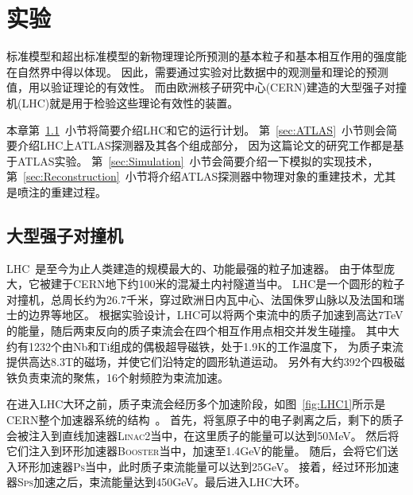 

\chapter{实验}
\label{cha:EXP}

标准模型和超出标准模型的新物理理论所预测的基本粒子和基本相互作用的强度能在自然界中得以体现。
因此，需要通过实验对比数据中的观测量和理论的预测值，用以验证理论的有效性。
而由欧洲核子研究中心(CERN)建造的大型强子对撞机(LHC)就是用于检验这些理论有效性的装置。

本章第~\ref{sec:LHC}~小节将简要介绍LHC和它的运行计划。
第~\ref{sec:ATLAS}~小节则会简要介绍LHC上ATLAS探测器及其各个组成部分，
因为这篇论文的研究工作都是基于ATLAS实验。
第~\ref{sec:Simulation}~小节会简要介绍一下模拟的实现技术，
第~\ref{sec:Reconstruction}~小节将介绍ATLAS探测器中物理对象的重建技术，尤其是喷注的重建过程。

\section{大型强子对撞机}
\label{sec:LHC}

LHC~\cite{Evans:2008zzb}是至今为止人类建造的规模最大的、功能最强的粒子加速器。
由于体型庞大，它被建于CERN地下约100米的混凝土内衬隧道当中。
LHC是一个圆形的粒子对撞机，总周长约为26.7千米，穿过欧洲日内瓦中心、法国侏罗山脉以及法国和瑞士的边界等地区。
根据实验设计，LHC可以将两个束流中的质子加速到高达7TeV的能量，随后两束反向的质子束流会在四个相互作用点相交并发生碰撞。
其中大约有1232个由Nb和Ti组成的偶极超导磁铁，处于1.9K的工作温度下，
为质子束流提供高达8.3T的磁场，并使它们沿特定的圆形轨道运动。
另外有大约392个四极磁铁负责束流的聚焦，16个射频腔为束流加速。

在进入LHC大环之前，质子束流会经历多个加速阶段，如图~\ref{fig:LHC1}所示是CERN整个加速器系统的结构~\cite{LHCImage1}。
首先，将氢原子中的电子剥离之后，剩下的质子会被注入到直线加速器\textsc{Linac2}当中，在这里质子的能量可以达到50MeV。
然后将它们注入到环形加速器\textsc{Booster}当中，加速至1.4GeV的能量。
随后，会将它们送入环形加速器\textsc{Ps}当中，此时质子束流能量可以达到25GeV。
接着，经过环形加速器\textsc{Sps}加速之后，束流能量达到450GeV。最后进入LHC大环。

